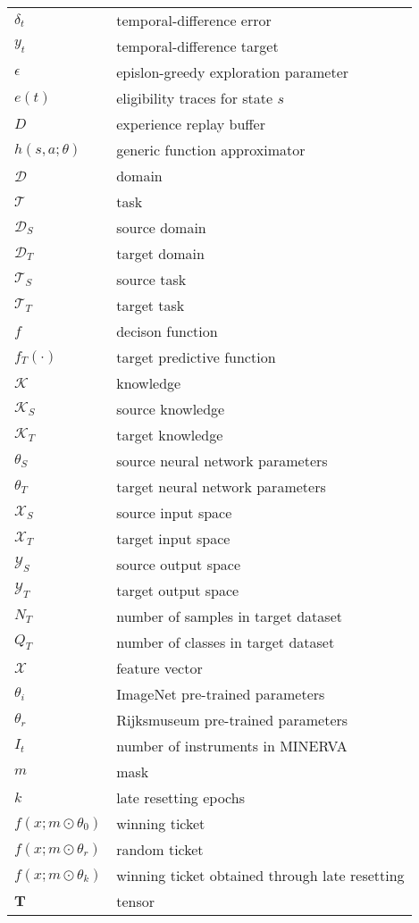 \begin{tabularx}{\textwidth}{ l X }
	$\delta_t$ & temporal-difference error \\ 
$y_t$ & temporal-difference target \\ 
$\epsilon$ & epislon-greedy exploration parameter \\
$e(t)$ & eligibility traces for state $s$ \\
$D$ & experience replay buffer \\
$h(s,a;\theta)$ & generic function approximator \\ 	
	$\mathcal{D}$ & domain \\ 
	$\mathcal{T}$ & task \\ 
	$\mathcal{D}_S$ & source domain \\ 
	$\mathcal{D}_T$ & target domain \\ 
	$\mathcal{T}_S$ & source task \\
	$\mathcal{T}_T$ & target task \\
	$f$ & decison function \\ 
	$f_T(\cdot)$ & target predictive function \\
	$\mathcal{K}$ & knowledge \\ 
	$\mathcal{K}_S$ & source knowledge \\
	$\mathcal{K}_T$ & target knowledge \\
	$\theta_S$ & source neural network parameters \\ 
	$\theta_T$ & target neural network parameters \\
	$\mathcal{X}_S$ & source input space \\
	$\mathcal{X}_T$ & target input space \\ 
	$\mathcal{Y}_S$ & source output space \\
	$\mathcal{Y}_T$ & target output space \\
	$N_T$ & number of samples in target dataset \\ 
	$Q_T$ & number of classes in target dataset \\	
	$\mathscr{X}$ & feature vector \\
	$\theta_i$ & ImageNet pre-trained parameters \\ 
	$\theta_r$ & Rijksmuseum pre-trained parameters \\
	$I_t$ & number of instruments in MINERVA \\ 
	$m$ & mask \\
	$k$ & late resetting epochs \\
	$f(x;m\odot\theta_0)$ & winning ticket \\
	$f(x;m\odot\theta_r)$ & random ticket \\ 
	$f(x;m\odot\theta_k)$ & winning ticket obtained through late resetting \\
	$\mathbf{T}$ & tensor \\ 
		
\end{tabularx}
\clearpage


